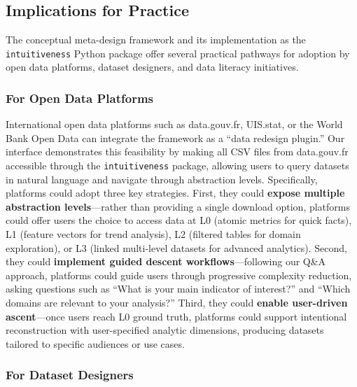 \documentclass[Afour,times,sageh]{sagej}
\begin{document}
\subsection{Implications for Practice}


The conceptual meta-design framework and its implementation as the \texttt{intuitiveness} Python package offer several practical pathways for adoption by open data platforms, dataset designers, and data literacy initiatives.

\subsubsection{For Open Data Platforms}

International open data platforms such as data.gouv.fr, UIS.stat, or the World Bank Open Data can integrate the framework as a ``data redesign plugin.'' Our interface demonstrates this feasibility by making all CSV files from data.gouv.fr accessible through the \texttt{intuitiveness} package, allowing users to query datasets in natural language and navigate through abstraction levels. Specifically, platforms could adopt three key strategies. First, they could \textbf{expose multiple abstraction levels}---rather than providing a single download option, platforms could offer users the choice to access data at L0 (atomic metrics for quick facts), L1 (feature vectors for trend analysis), L2 (filtered tables for domain exploration), or L3 (linked multi-level datasets for advanced analytics). Second, they could \textbf{implement guided descent workflows}---following our Q\&A approach, platforms could guide users through progressive complexity reduction, asking questions such as ``What is your main indicator of interest?'' and ``Which domains are relevant to your analysis?'' Third, they could \textbf{enable user-driven ascent}---once users reach L0 ground truth, platforms could support intentional reconstruction with user-specified analytic dimensions, producing datasets tailored to specific audiences or use cases.

\subsubsection{For Dataset Designers}
\end{document}
